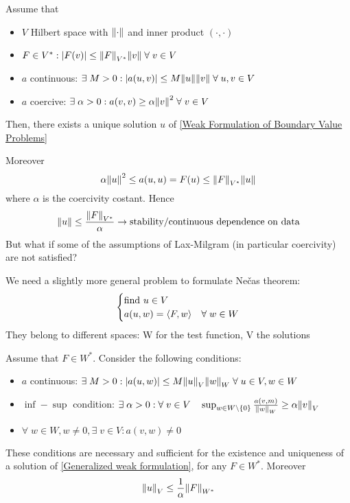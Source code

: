 \begin{theorem}
    Assume that 
    \begin{itemize}
        \item \(V\) Hilbert space with \(\norm{\cdot}\) and inner product \((\cdot, \cdot)\)
        \item \(F \in V^*: \abs{F(v)} \leq \norm{F}_{V^*}\norm{v} \; \forall \; v \in V\)
        \item \(a\) continuous: \(\exists \; M > 0: \abs{a(u,v)} \leq M \norm{u}\norm{v} \; \forall \; u,v \in V\)
        \item \(a\) coercive: \(\exists \; \alpha > 0: a(v,v) \geq \alpha\norm{v}^2 \; \forall \; v \in V\)
    \end{itemize}
    Then, there exists a unique solution \(u\) of \ref*{Weak Formulation of Boundary Value Problems}
\end{theorem}
Moreover 
\[
    \alpha \norm{u}^2 \leq a(u,u) = F(u) \leq \norm{F}_{V^*} \norm{u}
\]
where \(\alpha\) is the coercivity costant. Hence
\[
    \norm{u} \leq \frac{\norm{F}_{V^*}}{\alpha} \to \text{stability/continuous dependence on data}
\]
But what if some of the assumptions of Lax-Milgram (in particular coercivity) are not satisfied?

We need a slightly more general problem to formulate Nečas theorem:
\begin{equation}
    \begin{cases}
        \text{find } u \in V \\
        a(u,w) = \langle F,w \rangle & \forall \; w \in W \label{Generalized weak formulation}
    \end{cases}
\end{equation}
They belong to different spaces: W for the test function, V the solutions
\begin{theorem}[Nečas]
    Assume that \(F \in W^*\). Consider the following conditions:
    \begin{itemize}
        \item \(a\) continuous: \(\exists \; M > 0: \abs{a(u,w)} \leq M \norm{u}_V \norm{w}_W \; \forall \; u \in V, w \in W\)
        \item \(\inf-\sup\) condition: \(\exists \; \alpha > 0: \forall \; v \in V \quad \sup_{w \in W \setminus \left\{0\right\}} \frac{a(v,m)}{\norm{w}_W} \geq \alpha \norm{v}_V\)
        \item \(\forall \; w \in W, w \neq 0, \exists \; v \in V : a(v,w) \neq 0\)
    \end{itemize}
    These conditions are necessary and sufficient for the existence and uniqueness of a solution of \ref*{Generalized weak formulation}, for any \(F \in W^*\). Moreover 
    \[
        \norm{u}_V \leq \frac{1}{\alpha}\norm{F}_{W^*}
    \]
\label{Nečas}
\end{theorem}

